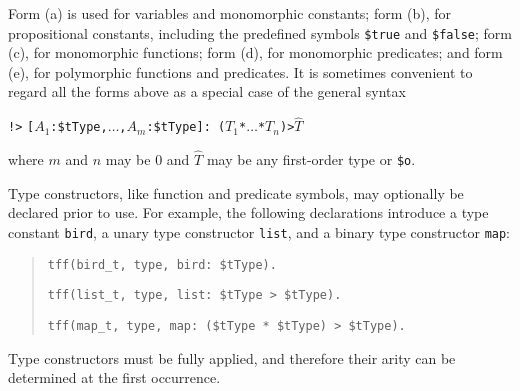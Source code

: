 Form (a) is used for variables and monomorphic constants; form (b), for
propositional constants, including the predefined symbols \verb+$true+ and
\verb+$false+; form (c), for monomorphic functions; form (d), for monomorphic
predicates; and form (e), for polymorphic functions and predicates.
It is sometimes convenient to regard all the forms above as a special case of
the general syntax
\begin{center}
{\tt !>} {\tt [$A_1$\;:\;\$tType,\;${\dots}$,\;$A_m$\;:\;\$tType]:\;%
($T_1$\;*\;${\dots}$\;*\;$T_n$)\;>\;$\widehat T$}
\end{center}
where $m$ and $n$ may be 0 and $\widehat T$ may be any first-order type or
{\tt \$o}.



 Type constructors,
like function and predicate symbols,
may optionally be declared prior to use.
For example, the following declarations introduce a type
constant {\tt bird}, a unary type constructor {\tt list},
and a binary type constructor {\tt map}:
\begin{quote}
\verb+tff(bird_t, type, bird: $tType).+
\par\smallskip
\verb+tff(list_t, type, list: $tType > $tType).+
\par\smallskip
\verb+tff(map_t, type, map: ($tType * $tType) > $tType).+
\end{quote}
Type constructors must be fully applied, and therefore
their arity can be %
determined at the first occurrence.

